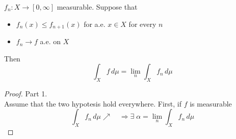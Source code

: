\begin{theorem}
    \(f_n:X\to \left[0, \infty\right]\) measurable. Suppose that 
    \begin{itemize}
        \item \(f_n(x) \leq f_{n+1}(x)\) for a.e. \(x \in X\) for every \(n\)
        \item \(f_n \to f \) a.e. on \(X\)
    \end{itemize} 
    Then \[ \int_X f \, d\mu = \lim_n \int_X f_n \, d\mu\]
\end{theorem}
\begin{proof}
    Part 1. \\
    Assume that the two hypotesis hold everywhere. First, if \(f\) is measurable 
    \[
        \int_X f_n \, d\mu \nearrow \quad \Rightarrow \exists \; \alpha = \lim_n \int_X f_n \, d\mu
    \]
    

\end{proof}
